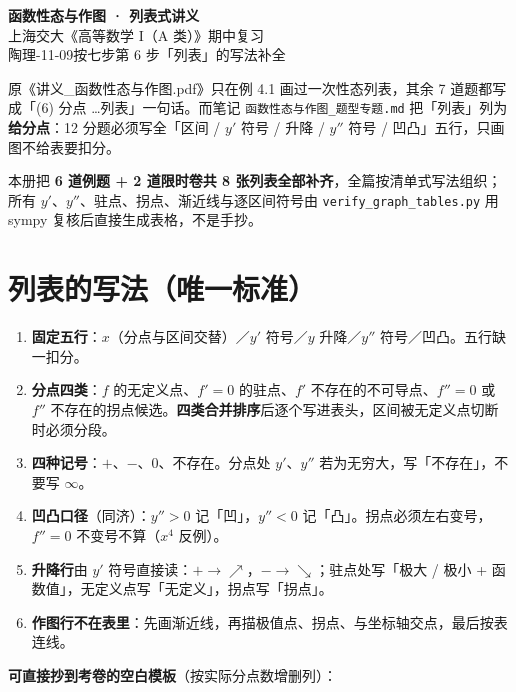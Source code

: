 \documentclass[11pt,a4paper]{ctexart}
\begin{document}
\begin{center}
  {\LARGE\bfseries 函数性态与作图 · 列表式讲义}\\[4pt]
  {\large 上海交大《高等数学 I（A 类）》期中复习}\\[4pt]
  {\small 陶理-11-09\quad 按七步第 6 步「列表」的写法补全}
\end{center}

\begin{keypoint}[这一册解决什么]
原《讲义\_函数性态与作图.pdf》只在例 4.1 画过一次性态列表，其余 7 道题都写成「(6) 分点 \ldots 列表」一句话。而笔记 \texttt{函数性态与作图\_题型专题.md} 把「列表」列为\textbf{给分点}：12 分题必须写全「区间 / $y'$ 符号 / 升降 / $y''$ 符号 / 凹凸」五行，只画图不给表要扣分。

本册把 \textbf{6 道例题 + 2 道限时卷共 8 张列表全部补齐}，全篇按清单式写法组织；所有 $y'$、$y''$、驻点、拐点、渐近线与逐区间符号由 \texttt{verify\_graph\_tables.py} 用 sympy 复核后直接生成表格，不是手抄。
\end{keypoint}

\section{列表的写法（唯一标准）}

\begin{enumerate}[label=\textbf{(\arabic*)},leftmargin=2.1em]
\item \textbf{固定五行}：$x$（分点与区间交替）／$y'$ 符号／$y$ 升降／$y''$ 符号／凹凸。五行缺一扣分。
\item \textbf{分点四类}：$f$ 的无定义点、$f'=0$ 的驻点、$f'$ 不存在的不可导点、$f''=0$ 或 $f''$ 不存在的拐点候选。\textbf{四类合并排序}后逐个写进表头，区间被无定义点切断时必须分段。
\item \textbf{四种记号}：$+$、$-$、$0$、不存在。分点处 $y'$、$y''$ 若为无穷大，写「不存在」，不要写 $\infty$。
\item \textbf{凹凸口径}（同济）：$y''>0$ 记「凹」，$y''<0$ 记「凸」。拐点必须左右变号，$f''=0$ 不变号不算（$x^4$ 反例）。
\item \textbf{升降行}由 $y'$ 符号直接读：$+\to\nearrow$，$-\to\searrow$；驻点处写「极大 / 极小 + 函数值」，无定义点写「无定义」，拐点写「拐点」。
\item \textbf{作图行不在表里}：先画渐近线，再描极值点、拐点、与坐标轴交点，最后按表连线。
\end{enumerate}

\noindent\textbf{可直接抄到考卷的空白模板}（按实际分点数增删列）：
\end{document}
